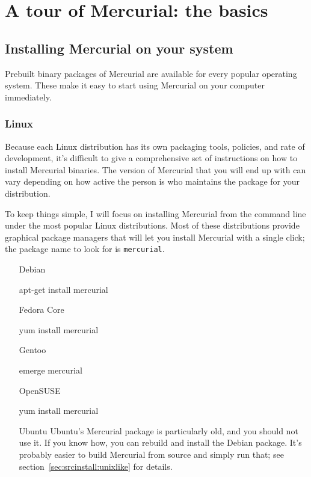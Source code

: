 \chapter{A tour of Mercurial: the basics}
\label{chap:tour-basic}

\section{Installing Mercurial on your system}
\label{sec:tour:install}

Prebuilt binary packages of Mercurial are available for every popular
operating system.  These make it easy to start using Mercurial on your
computer immediately.

\subsection{Linux}

Because each Linux distribution has its own packaging tools, policies,
and rate of development, it's difficult to give a comprehensive set of
instructions on how to install Mercurial binaries.  The version of
Mercurial that you will end up with can vary depending on how active
the person is who maintains the package for your distribution.

To keep things simple, I will focus on installing Mercurial from the
command line under the most popular Linux distributions.  Most of
these distributions provide graphical package managers that will let
you install Mercurial with a single click; the package name to look
for is \texttt{mercurial}.

\begin{itemize}
\item[Debian]
  \begin{codesample4}
    apt-get install mercurial
  \end{codesample4}

\item[Fedora Core]
  \begin{codesample4}
    yum install mercurial
  \end{codesample4}

\item[Gentoo]
  \begin{codesample4}
    emerge mercurial
  \end{codesample4}

\item[OpenSUSE]
  \begin{codesample4}
    yum install mercurial
  \end{codesample4}

\item[Ubuntu] Ubuntu's Mercurial package is particularly old, and you
  should not use it.  If you know how, you can rebuild and install the
  Debian package.  It's probably easier to build Mercurial from source
  and simply run that; see section~\ref{sec:srcinstall:unixlike} for
  details.
\end{itemize}

